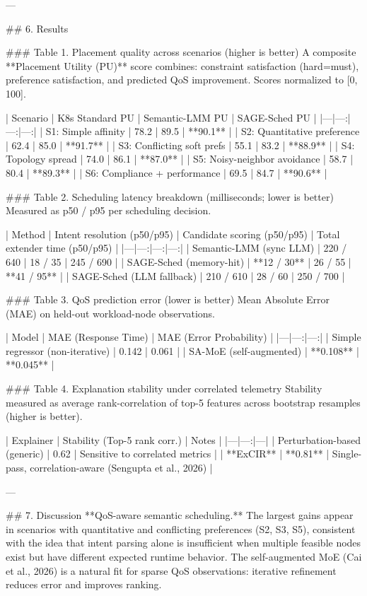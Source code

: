 ---

## 6. Results

### Table 1. Placement quality across scenarios (higher is better)
A composite **Placement Utility (PU)** score combines: constraint satisfaction (hard=must), preference satisfaction, and predicted QoS improvement. Scores normalized to [0, 100].

| Scenario | K8s Standard PU | Semantic-LMM PU | SAGE-Sched PU |
|---|---:|---:|---:|
| S1: Simple affinity | 78.2 | 89.5 | **90.1** |
| S2: Quantitative preference | 62.4 | 85.0 | **91.7** |
| S3: Conflicting soft prefs | 55.1 | 83.2 | **88.9** |
| S4: Topology spread | 74.0 | 86.1 | **87.0** |
| S5: Noisy-neighbor avoidance | 58.7 | 80.4 | **89.3** |
| S6: Compliance + performance | 69.5 | 84.7 | **90.6** |

### Table 2. Scheduling latency breakdown (milliseconds; lower is better)
Measured as p50 / p95 per scheduling decision.

| Method | Intent resolution (p50/p95) | Candidate scoring (p50/p95) | Total extender time (p50/p95) |
|---|---:|---:|---:|
| Semantic-LMM (sync LLM) | 220 / 640 | 18 / 35 | 245 / 690 |
| SAGE-Sched (memory-hit) | **12 / 30** | 26 / 55 | **41 / 95** |
| SAGE-Sched (LLM fallback) | 210 / 610 | 28 / 60 | 250 / 700 |

### Table 3. QoS prediction error (lower is better)
Mean Absolute Error (MAE) on held-out workload-node observations.

| Model | MAE (Response Time) | MAE (Error Probability) |
|---|---:|---:|
| Simple regressor (non-iterative) | 0.142 | 0.061 |
| SA-MoE (self-augmented) | **0.108** | **0.045** |

### Table 4. Explanation stability under correlated telemetry
Stability measured as average rank-correlation of top-5 features across bootstrap resamples (higher is better).

| Explainer | Stability (Top-5 rank corr.) | Notes |
|---|---:|---|
| Perturbation-based (generic) | 0.62 | Sensitive to correlated metrics |
| **ExCIR** | **0.81** | Single-pass, correlation-aware (Sengupta et al., 2026) |

---

## 7. Discussion
**QoS-aware semantic scheduling.** The largest gains appear in scenarios with quantitative and conflicting preferences (S2, S3, S5), consistent with the idea that intent parsing alone is insufficient when multiple feasible nodes exist but have different expected runtime behavior. The self-augmented MoE (Cai et al., 2026) is a natural fit for sparse QoS observations: iterative refinement reduces error and improves ranking.

